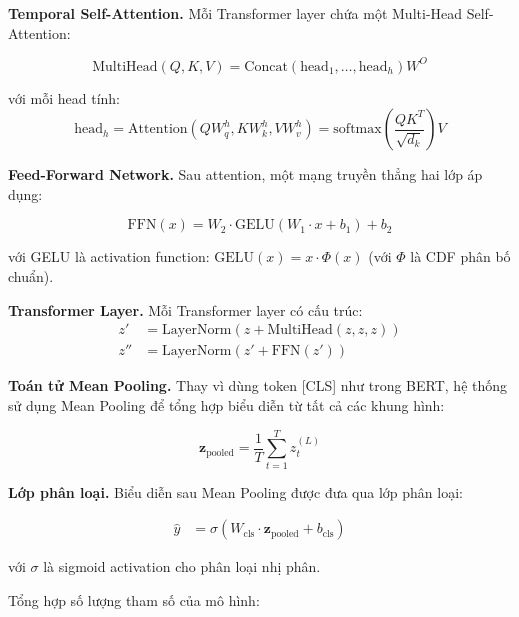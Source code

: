 \textbf{Temporal Self-Attention.} Mỗi Transformer layer chứa một Multi-Head Self-Attention:

\begin{equation}
\text{MultiHead}(Q, K, V) = \text{Concat}(\text{head}_1, \ldots, \text{head}_h) W^O
\end{equation}

với mỗi head tính:
\begin{equation}
\text{head}_h = \text{Attention}(Q W_q^h, K W_k^h, V W_v^h) = \text{softmax}\left(\frac{Q K^T}{\sqrt{d_k}}\right) V
\end{equation}

\textbf{Feed-Forward Network.} Sau attention, một mạng truyền thẳng hai lớp áp dụng:

\begin{equation}
\text{FFN}(x) = W_2 \cdot \text{GELU}(W_1 \cdot x + b_1) + b_2
\end{equation}

với GELU là activation function: $\text{GELU}(x) = x \cdot \Phi(x)$ (với $\Phi$ là CDF phân bố chuẩn).

\textbf{Transformer Layer.} Mỗi Transformer layer có cấu trúc:
\begin{align}
z' &= \text{LayerNorm}(z + \text{MultiHead}(z, z, z)) \\
z'' &= \text{LayerNorm}(z' + \text{FFN}(z'))
\end{align}

\textbf{Toán tử Mean Pooling.} Thay vì dùng token [CLS] như trong BERT, hệ thống sử dụng Mean Pooling để tổng hợp biểu diễn từ tất cả các khung hình:

\begin{equation}
\mathbf{z}_{\text{pooled}} = \frac{1}{T} \sum_{t=1}^{T} z_t^{(L)}
\end{equation}

\textbf{Lớp phân loại.} Biểu diễn sau Mean Pooling được đưa qua lớp phân loại:

\begin{align}
\hat{y} &= \sigma(W_{\text{cls}} \cdot \mathbf{z}_{\text{pooled}} + b_{\text{cls}})
\end{align}

với $\sigma$ là sigmoid activation cho phân loại nhị phân.

Tổng hợp số lượng tham số của mô hình:

